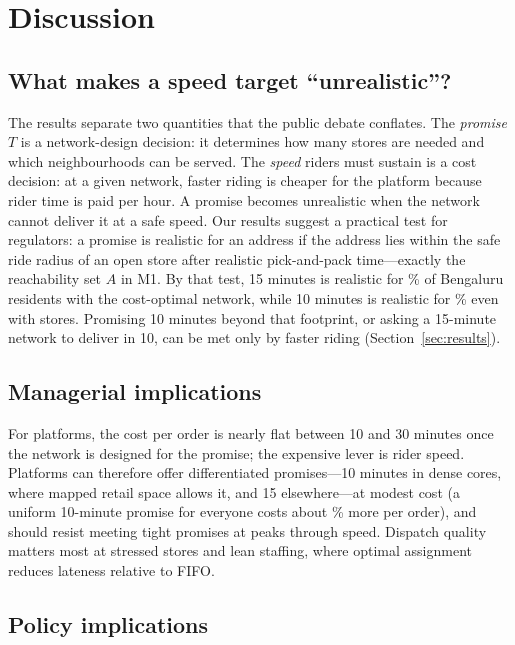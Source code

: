 \section{Discussion}\label{sec:discussion}

\subsection{What makes a speed target ``unrealistic''?}

The results separate two quantities that the public debate conflates. The \emph{promise} $T$ is a network-design decision: it determines how many stores are needed and which neighbourhoods can be served. The \emph{speed} riders must sustain is a cost decision: at a given network, faster riding is cheaper for the platform because rider time is paid per hour. A promise becomes unrealistic when the network cannot deliver it at a safe speed. Our results suggest a practical test for regulators: a promise is realistic for an address if the address lies within the safe ride radius of an open store after realistic pick-and-pack time---exactly the reachability set $A$ in M1. By that test, 15 minutes is realistic for \ServedFifteenPct\% of Bengaluru residents with the cost-optimal network, while 10 minutes is realistic for \ServedTenPct\% even with \StoresTTen{} stores. Promising 10 minutes beyond that footprint, or asking a 15-minute network to deliver in 10, can be met only by faster riding (Section~\ref{sec:results}).

\subsection{Managerial implications}

For platforms, the cost per order is nearly flat between 10 and 30 minutes once the network is designed for the promise; the expensive lever is rider speed. Platforms can therefore offer differentiated promises---10 minutes in dense cores, where mapped retail space allows it, and 15 elsewhere---at modest cost (a uniform 10-minute promise for everyone costs about \GridCostPremiumPct\% more per order), and should resist meeting tight promises at peaks through speed. Dispatch quality matters most at stressed stores and lean staffing, where optimal assignment reduces lateness relative to FIFO.

\subsection{Policy implications}

